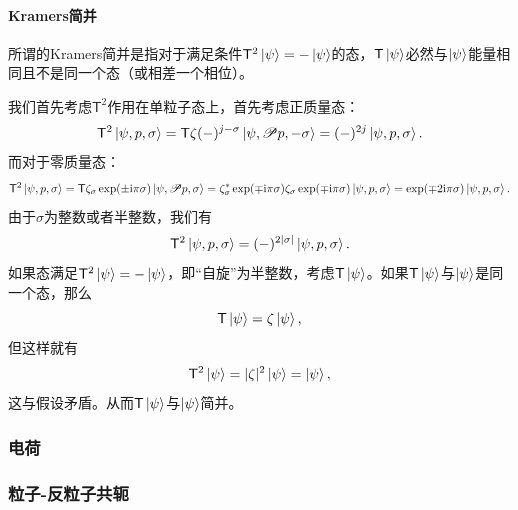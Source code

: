 \paragraph{Kramers简并}
所谓的Kramers简并是指对于满足条件$\mathsf{T}^{2}\ket{\psi } =-\ket{\psi }$的态，$\mathsf{T}\ket{\psi }$必然与$\ket{\psi }$能量相同且不是同一个态（或相差一个相位）。

我们首先考虑$\mathsf{T}^{2}$作用在单粒子态上，首先考虑正质量态：
\begin{equation*}
	\mathsf{T}^{2}\ket{\psi ,p,\sigma } =\mathsf{T} \zeta ( -)^{j-\sigma }\ket{\psi ,\mathscr{P} p,-\sigma } =( -)^{2j}\ket{\psi ,p,\sigma } .
\end{equation*}
而对于零质量态：
\begin{equation*}
	\mathsf{T}^{2}\ket{\psi ,p,\sigma } =\mathsf{T} \zeta _{\sigma }\exp( \pm \mathrm{i} \pi \sigma )\ket{\psi ,\mathscr{P} p,\sigma } =\zeta _{\sigma }^{*}\exp( \mp \mathrm{i} \pi \sigma ) \zeta _{\sigma }\exp( \mp \mathrm{i} \pi \sigma )\ket{\psi ,p,\sigma } =\exp( \mp 2\mathrm{i} \pi \sigma )\ket{\psi ,p,\sigma } .
\end{equation*}
由于$\sigma $为整数或者半整数，我们有
\begin{equation*}
	\mathsf{T}^{2}\ket{\psi ,p,\sigma } =( -)^{2| \sigma | }\ket{\psi ,p,\sigma } .
\end{equation*}
如果态满足$\mathsf{T}^{2}\ket{\psi } =-\ket{\psi }$，即“自旋”为半整数，考虑$\mathsf{T}\ket{\psi }$。如果$\mathsf{T}\ket{\psi }$与$\ket{\psi }$是同一个态，那么
\begin{equation*}
	\mathsf{T}\ket{\psi } =\zeta \ket{\psi } ,
\end{equation*}
但这样就有
\begin{equation*}
	\mathsf{T}^{2}\ket{\psi } =| \zeta | ^{2}\ket{\psi } =\ket{\psi } ,
\end{equation*}
这与假设矛盾。从而$\mathsf{T}\ket{\psi }$与$\ket{\psi }$简并。

\subsubsection{电荷}

\subsubsection{粒子-反粒子共轭}